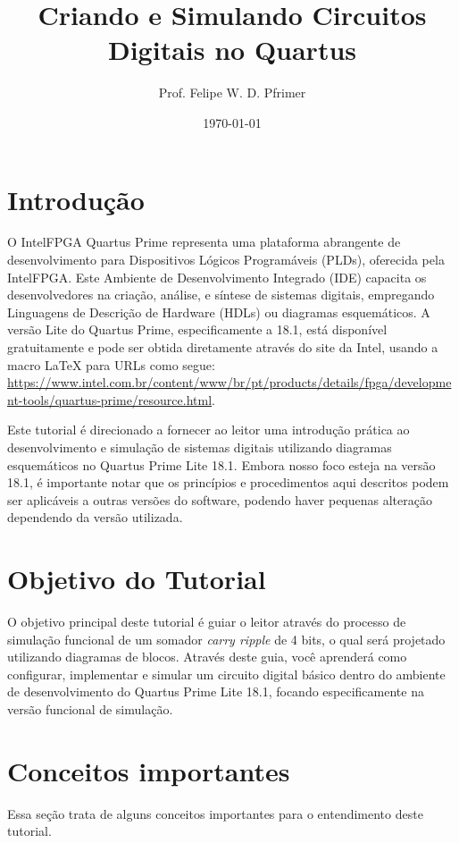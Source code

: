 \documentclass[12pt,a4paper]{article}
\title{\textbf{Criando e Simulando Circuitos Digitais no Quartus}}
\author{Prof. Felipe W. D. Pfrimer}
\date{\today}
\newcommand{\DonwloadUrl}{\url{https://www.intel.com.br/content/www/br/pt/products/details/fpga/development-tools/quartus-prime/resource.html}}
\newcommand{\Version}{18.1}
\begin{document}
\maketitle
\newpage
\tableofcontents
\newpage

\section{Introdução}

O IntelFPGA Quartus Prime representa uma plataforma abrangente de desenvolvimento para Dispositivos Lógicos Programáveis (PLDs), oferecida pela IntelFPGA. Este Ambiente de Desenvolvimento Integrado (IDE) capacita os desenvolvedores na criação, análise, e síntese de sistemas digitais, empregando Linguagens de Descrição de Hardware (HDLs) ou diagramas esquemáticos. A versão Lite do Quartus Prime, especificamente a \Version, está disponível gratuitamente e pode ser obtida diretamente através do site da Intel, usando a macro LaTeX para URLs como segue: \DonwloadUrl.%

Este tutorial é direcionado a fornecer ao leitor uma introdução prática ao desenvolvimento e simulação de sistemas digitais utilizando diagramas esquemáticos no Quartus Prime Lite \Version. Embora nosso foco esteja na versão \Version, é importante notar que os princípios e procedimentos aqui descritos podem ser aplicáveis a outras versões do software, podendo haver pequenas alteração dependendo da versão utilizada.


\section{Objetivo do Tutorial}

O objetivo principal deste tutorial é guiar o leitor através do processo de simulação funcional de um somador \textit{carry ripple} de 4 bits, o qual será projetado utilizando diagramas de blocos. Através deste guia, você aprenderá como configurar, implementar e simular um circuito digital básico dentro do ambiente de desenvolvimento do Quartus Prime Lite \Version, focando especificamente na versão funcional de simulação.

\section{Conceitos importantes}

Essa seção trata de alguns conceitos importantes para o entendimento deste tutorial.
\end{document}
